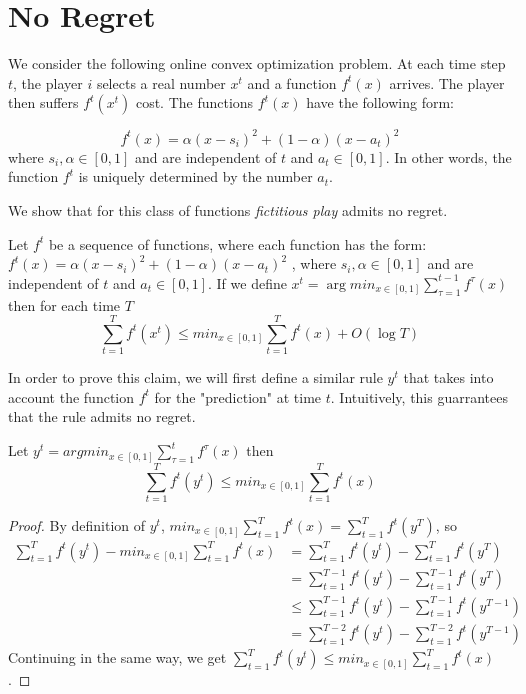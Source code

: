 \section{No Regret}
We consider the following online convex optimization problem.
At each time step $t$, the player $i$ selects a real number $x^t$ and a
function $f^t(x)$ arrives. The player then suffers $f^t(x^t)$ cost.
The functions $f^t(x)$ have the following form:

$$f^t(x) = \alpha(x-s_i)^2 + (1-\alpha)(x-a_t)^2$$
where $s_i,\alpha \in [0,1]$ and are independent of $t$ and $a_t \in [0,1]$.
In other words, the function $f^t$ is uniquely determined by the number $a_t$.

We show that for this class of functions \emph{fictitious play} admits no regret.
\begin{theorem}\label{t:no_regret}
  Let $f^t$ be a sequence of functions, where each function has the form: $f^t(x) = \alpha(x-s_i)^2 + (1-\alpha)(x-a_t)^2$ , where $s_i,\alpha \in [0,1]$ and are independent of $t$ and $a_t \in [0,1]$. If we define $x^t = \arg min_{x \in [0,1]} \sum_{\tau = 1}^{t-1} f^\tau (x)$ then for each time $T$
  $$
  \sum_{t = 1}^{T} f^t(x^t) \leq min_{x \in [0,1]} \sum_{t=1}^T f^t(x) + O(\log  T)
  $$
\end{theorem}

In order to prove this claim, we will first define a similar rule $y^t$ that takes into account the function $f^t$
for the "prediction" at time $t$. Intuitively, this guarrantees that the rule admits no regret.


\begin{lemma} Let $y^t = argmin_{x \in [0,1]} \sum_{\tau = 1}^t f^\tau (x)$ then
  $$ \sum_{t=1}^T f^t(y^t) \leq min_{x \in [0,1]} \sum_{t=1}^T f^t(x)$$
\end{lemma}
\begin{proof}By definition of $y^t$,
  $min_{x \in [0,1]} \sum_{t=1}^T f^t(x) = \sum_{t=1}^T f^t(y^T)$, so
  \begin{align*}
    \sum_{t=1}^T f^t(y^t) - min_{x \in [0,1]} \sum_{t=1}^T f^t(x) &=
    \sum_{t=1}^T f^t(y^t) - \sum_{t=1}^T f^t(y^T)\\
    &= \sum_{t=1}^{T-1} f^t(y^t) - \sum_{t=1}^{T-1} f^t(y^T)\\
    &\leq \sum_{t=1}^{T-1} f^t(y^t) - \sum_{t=1}^{T-1} f^t(y^{T-1})\\
    &= \sum_{t=1}^{T-2} f^t(y^t) - \sum_{t=1}^{T-2} f^t(y^{T-1})
  \end{align*}
  Continuing in the same way, we get
  $\sum_{t=1}^T f^t(y^t) \leq min_{x \in [0,1]} \sum_{t=1}^T f^t(x)$.
\end{proof}

